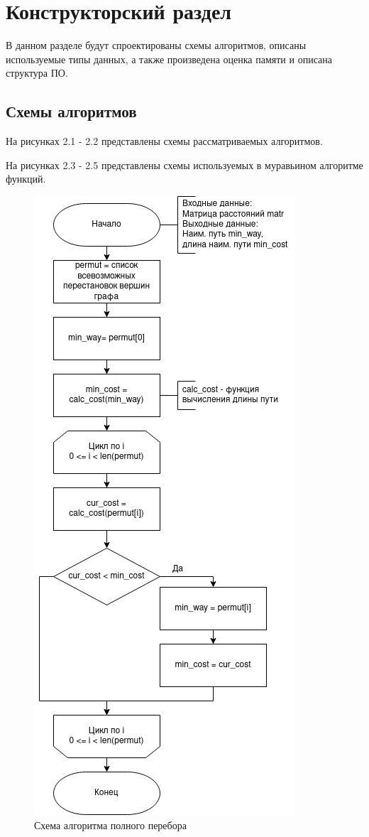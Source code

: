 \chapter{Конструкторский раздел}

В данном разделе будут спроектированы схемы алгоритмов, описаны используемые типы данных, а также произведена оценка памяти и описана структура ПО.

\section{Схемы алгоритмов}

На рисунках 2.1 - 2.2 представлены схемы рассматриваемых алгоритмов.

На рисунках 2.3 - 2.5 представлены схемы используемых в муравьином алгоритме функций.

\begin{figure}[H]
	\begin{center}
		\includegraphics[scale=0.6]{assets/enum.png}
	\end{center}
	\caption{Схема алгоритма полного перебора}
\end{figure}

